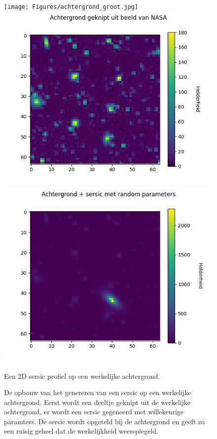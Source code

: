 \begin{figure}
    \begin{minipage}{0.98\linewidth}
        \centering
       \texttt{[image: Figures/achtergrond\_groot.jpg]}
        \label{fig:NASA} 
        \includegraphics[width=0.85\linewidth]{Figures/sersic_achtergrond.png}
        \label{fig: kleine achtergrond}
        \includegraphics[width=0.85\linewidth]{Figures/sersic+achtergrond.png}
        \caption{Een 2D sersic profiel op een werkelijke achtergrond.}
        \label{fig:achtergrond+sersic}
    \end{minipage}
    \caption{De opbouw van het genereren van een sersic op een werkelijke achtergrond. Eerst wordt een deeltje geknipt uit de werkelijke achtergrond, er wordt een sersic gegeneerd met willekeurige paramters. De sersic wordt opgeteld bij de achtergrond en geeft zo een ruisig geheel dat de werkelijkheid weerspiegeld.}
\end{figure}
